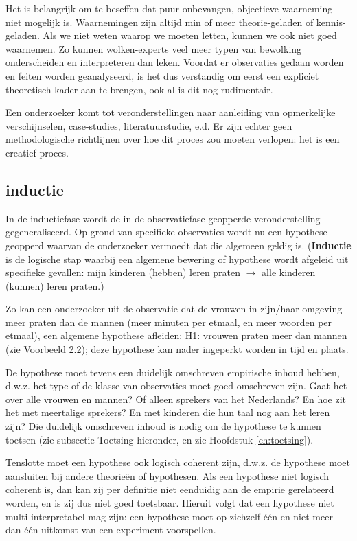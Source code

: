 \documentclass[
]{book}
\begin{document}
Het is belangrijk om te beseffen dat puur onbevangen, objectieve
waarneming niet mogelijk is. Waarnemingen zijn altijd min of meer
theorie-geladen of kennis-geladen. Als we niet weten waarop we moeten
letten, kunnen we ook niet goed waarnemen. Zo kunnen wolken-experts veel
meer typen van bewolking onderscheiden en interpreteren dan leken.
Voordat er observaties gedaan worden en feiten worden geanalyseerd, is
het dus verstandig om eerst een expliciet theoretisch kader aan te
brengen, ook al is dit nog rudimentair.

Een onderzoeker komt tot veronderstellingen naar aanleiding van
opmerkelijke verschijnselen, case-studies, literatuurstudie, e.d. Er
zijn echter geen methodologische richtlijnen over hoe dit proces zou
moeten verlopen: het is een creatief proces.

\hypertarget{inductie}{%
\subsection{inductie}\label{inductie}}

In de inductiefase wordt de in de observatiefase geopperde
veronderstelling gegeneraliseerd. Op grond van specifieke observaties
wordt nu een hypothese geopperd waarvan de onderzoeker vermoedt dat die
algemeen geldig is. (\textbf{Inductie} is de logische stap waarbij een algemene
bewering of hypothese wordt afgeleid uit specifieke gevallen: mijn
kinderen (hebben) leren praten \(\rightarrow\) alle kinderen (kunnen)
leren praten.)

Zo kan een onderzoeker uit de observatie dat de vrouwen in zijn/haar
omgeving meer praten dan de mannen (meer minuten per etmaal, en meer
woorden per etmaal), een algemene hypothese afleiden: H1: vrouwen praten
meer dan mannen (zie Voorbeeld 2.2); deze hypothese kan nader ingeperkt
worden in tijd en plaats.

De hypothese moet tevens een duidelijk omschreven empirische inhoud
hebben, d.w.z. het type of de klasse van observaties moet goed
omschreven zijn. Gaat het over alle vrouwen en mannen? Of alleen
sprekers van het Nederlands? En hoe zit het met meertalige sprekers? En
met kinderen die hun taal nog aan het leren zijn? Die duidelijk
omschreven inhoud is nodig om de hypothese te kunnen toetsen (zie subsectie Toetsing hieronder, en zie Hoofdstuk \ref{ch:toetsing}).

Tenslotte moet een hypothese ook logisch coherent zijn, d.w.z. de
hypothese moet aansluiten bij andere theorieën of hypothesen. Als een
hypothese niet logisch coherent is, dan kan zij per definitie niet
eenduidig aan de empirie gerelateerd worden, en is zij dus niet goed
toetsbaar. Hieruit volgt dat een hypothese niet multi-interpretabel mag
zijn: een hypothese moet op zichzelf één en niet meer dan één uitkomst
van een experiment voorspellen.
\end{document}
